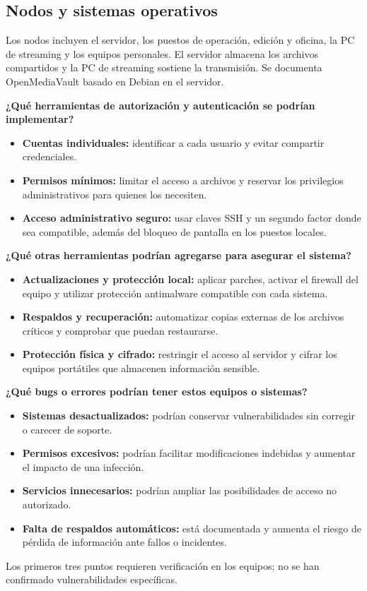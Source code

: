 \documentclass[12pt,a4paper]{article}
\begin{document}
\clearpage
\subsection{Nodos y sistemas operativos}
Los nodos incluyen el servidor, los puestos de operación, edición y oficina, la PC de streaming y los equipos personales. El servidor almacena los archivos compartidos y la PC de streaming sostiene la transmisión. Se documenta OpenMediaVault basado en Debian en el servidor. 
\par\textbf{¿Qué herramientas de autorización y autenticación se podrían implementar?}
\begin{itemize}[itemsep=3pt]
    \item \textbf{Cuentas individuales:} identificar a cada usuario y evitar compartir credenciales.
    \item \textbf{Permisos mínimos:} limitar el acceso a archivos y reservar los privilegios administrativos para quienes los necesiten.
    \item \textbf{Acceso administrativo seguro:} usar claves SSH y un segundo factor donde sea compatible, además del bloqueo de pantalla en los puestos locales.
\end{itemize}

\par\textbf{¿Qué otras herramientas podrían agregarse para asegurar el sistema?}
\begin{itemize}[itemsep=3pt]
    \item \textbf{Actualizaciones y protección local:} aplicar parches, activar el firewall del equipo y utilizar protección antimalware compatible con cada sistema.
    \item \textbf{Respaldos y recuperación:} automatizar copias externas de los archivos críticos y comprobar que puedan restaurarse.
    \item \textbf{Protección física y cifrado:} restringir el acceso al servidor y cifrar los equipos portátiles que almacenen información sensible.
\end{itemize}

\par\textbf{¿Qué bugs o errores podrían tener estos equipos o sistemas?}
\begin{itemize}[itemsep=3pt]
    \item \textbf{Sistemas desactualizados:} podrían conservar vulnerabilidades sin corregir o carecer de soporte.
    \item \textbf{Permisos excesivos:} podrían facilitar modificaciones indebidas y aumentar el impacto de una infección.
    \item \textbf{Servicios innecesarios:} podrían ampliar las posibilidades de acceso no autorizado.
    \item \textbf{Falta de respaldos automáticos:} está documentada y aumenta el riesgo de pérdida de información ante fallos o incidentes.
\end{itemize}
Los primeros tres puntos requieren verificación en los equipos; no se han confirmado vulnerabilidades específicas.
\end{document}
